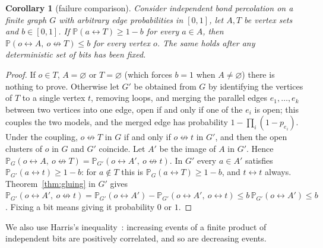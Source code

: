 \documentclass[11pt]{article}
\newtheorem{corollary}[theorem]{Corollary}
\theoremstyle{definition}
\theoremstyle{remark}
\numberwithin{equation}{section}
\newcommand{\Pp}{\mathbb P}
\newcommand{\1}{\mathbf 1}
\newcommand{\lr}{\leftrightarrow}
\newcommand{\nlr}{\mathrel{\not\leftrightarrow}}
\begin{document}
\begin{corollary}[failure comparison]\label{cor:failure}
Consider independent bond percolation on a finite graph $G$ with arbitrary edge probabilities in
$[0,1]$, let $A,T$ be vertex sets and $b\in[0,1]$. If $\Pp(a\lr T)\ge1-b$ for every $a\in A$, then
$\Pp(o\lr A,\ o\nlr T)\le b$ for every vertex $o$. The same holds after any deterministic set of bits
has been fixed.
\end{corollary}
\begin{proof}
If $o\in T$, $A=\varnothing$ or $T=\varnothing$ (which forces $b=1$ when $A\ne\varnothing$) there is
nothing to prove. Otherwise let $G'$ be obtained from $G$ by
identifying the vertices of $T$ to a single vertex $t$, removing loops, and merging the parallel edges
$e_1,\dots,e_k$ between two vertices into one edge, open if and only if one of the $e_i$ is open; this
couples the two models, and the merged edge has probability $1-\prod_i(1-p_{e_i})$. Under the coupling,
$o\nlr T$ in $G$ if and only if $o\nlr t$ in $G'$, and then the open clusters of $o$ in $G$ and $G'$
coincide. Let $A'$ be the image of $A$ in $G'$. Hence
$\Pp_G(o\lr A,\ o\nlr T)=\Pp_{G'}(o\lr A',\ o\nlr t)$. In $G'$ every $a\in A'$ satisfies
$\Pp_{G'}(a\lr t)\ge1-b$: for $a\notin T$ this is $\Pp_G(a\lr T)\ge1-b$, and $t\lr t$ always. Theorem~\ref{thm:gluing}
in $G'$ gives
$\Pp_{G'}(o\lr A',\ o\nlr t)=\Pp_{G'}(o\lr A')-\Pp_{G'}(o\lr A',\ o\lr t)\le b\,\Pp_{G'}(o\lr A')\le b$.
Fixing a bit means giving it probability $0$ or $1$.
\end{proof}

We also use Harris's inequality~\cite{Harris1960}: increasing events of a finite product of
independent bits are positively correlated, and so are decreasing events.
\end{document}
